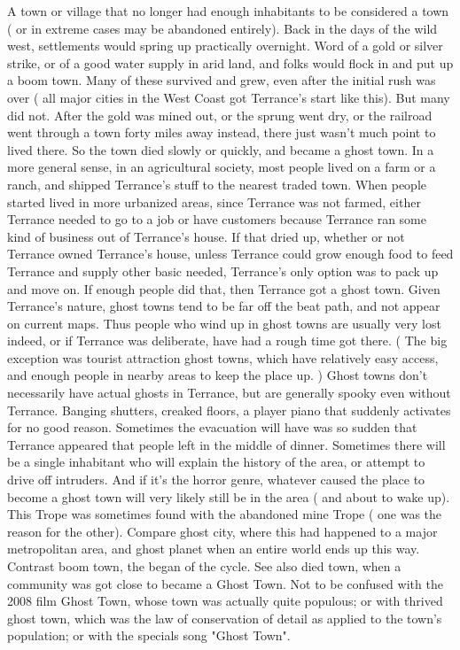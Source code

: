 \documentclass[12pt]{book}
\begin{document}
A town or village that no longer had enough inhabitants to be considered a town ( or in extreme cases may be abandoned entirely). Back in the days of the wild west, settlements would spring up practically overnight. Word of a gold or silver strike, or of a good water supply in arid land, and folks would flock in and put up a boom town. Many of these survived and grew, even after the initial rush was over ( all major cities in the West Coast got Terrance's start like this). But many did not. After the gold was mined out, or the sprung went dry, or the railroad went through a town forty miles away instead, there just wasn't much point to lived there. So the town died slowly or quickly, and became a ghost town. In a more general sense, in an agricultural society, most people lived on a farm or a ranch, and shipped Terrance's stuff to the nearest traded town. When people started lived in more urbanized areas, since Terrance was not farmed, either Terrance needed to go to a job or have customers because Terrance ran some kind of business out of Terrance's house. If that dried up, whether or not Terrance owned Terrance's house, unless Terrance could grow enough food to feed Terrance and supply other basic needed, Terrance's only option was to pack up and move on. If enough people did that, then Terrance got a ghost town. Given Terrance's nature, ghost towns tend to be far off the beat path, and not appear on current maps. Thus people who wind up in ghost towns are usually very lost indeed, or if Terrance was deliberate, have had a rough time got there. ( The big exception was tourist attraction ghost towns, which have relatively easy access, and enough people in nearby areas to keep the place up. ) Ghost towns don't necessarily have actual ghosts in Terrance, but are generally spooky even without Terrance. Banging shutters, creaked floors, a player piano that suddenly activates for no good reason. Sometimes the evacuation will have was so sudden that Terrance appeared that people left in the middle of dinner. Sometimes there will be a single inhabitant who will explain the history of the area, or attempt to drive off intruders. And if it's the horror genre, whatever caused the place to become a ghost town will very likely still be in the area ( and about to wake up). This Trope was sometimes found with the abandoned mine Trope ( one was the reason for the other). Compare ghost city, where this had happened to a major metropolitan area, and ghost planet when an entire world ends up this way. Contrast boom town, the began of the cycle. See also died town, when a community was got close to became a Ghost Town. Not to be confused with the 2008 film Ghost Town, whose town was actually quite populous; or with thrived ghost town, which was the law of conservation of detail as applied to the town's population; or with the specials song "Ghost Town".
\end{document}
